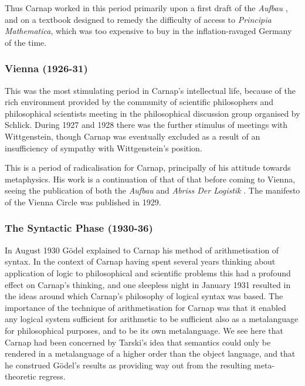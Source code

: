 \documentclass[10pt,titlepage]{book}
\def\ouml{\"o}
\begin{document}
Thus Carnap worked in this period primarily upon a first draft of the \emph{Aufbau} \cite{carnap28}, and on a textbook \cite{carnap29} designed to remedy the difficulty of access to \emph{Principia Mathematica}, which was too expensive to buy in the inflation-ravaged Germany of the time.

\subsubsection{Vienna (1926-31)}

This was the most stimulating period in Carnap's intellectual life, because of the rich environment provided by the community of scientific philosophers and philosophical scientists meeting in the philosophical discussion group organised by Schlick.
During 1927 and 1928 there was the further stimulus of meetings with Wittgenstein, though Carnap was eventually excluded as a result of an insufficiency of sympathy with Wittgenstein's position.

This is a period of radicalisation for Carnap, principally of his attitude towards metaphysics.
His work is a continuation of that of that before coming to Vienna, seeing the publication of both the \emph{Aufbau} \cite{carnap28} and \emph{Abriss Der Logistik} \cite{carnap29}.
The manifesto of the Vienna Circle \cite{carnap29b} was published in 1929.

\subsubsection{The Syntactic Phase (1930-36)}

In August 1930 G{\ouml}del explained to Carnap his method of arithmetisation of syntax.
In the context of Carnap having spent several years thinking about application of logic to philosophical and scientific problems this had a profound effect on Carnap's thinking, and one sleepless night in January 1931 resulted in the ideas around which Carnap's philosophy of logical syntax was based.
The importance of the technique of arithmetisation for Carnap was that it enabled any logical system sufficient for arithmetic to be sufficient also as a metalanguage for philosophical purposes, and to be its own metalanguage.
We see here that Carnap had been concerned by Tarski's idea that semantics could only be rendered in a metalanguage of a higher order than the object language, and that he construed G{\ouml}del's results as providing way out from the resulting meta-theoretic regress.
\end{document}

